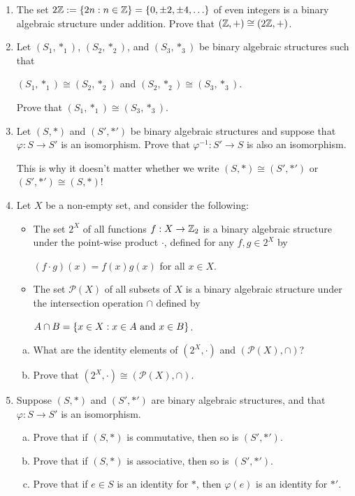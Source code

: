 \documentclass[11pt,fleqn,dvipsnames,usenames]{article}
\begin{document}
\begin{enumerate}[1.]
\item The set $2\mathbb{Z} := \left\{2n:n\in\mathbb{Z}\right\} = \left\{0, \pm 2, \pm 4,\ldots\right\}$ of even integers is a binary algebraic structure under addition.  Prove that $(\mathbb{Z},+)\cong (2\mathbb{Z},+)$.
%
\item Let $(S_{1},*_{1})$, $(S_{2}, *_{2})$, and $(S_{3}, *_{3})$ be binary algebraic structures such that
\begin{center}
$(S_{1},*_{1})\cong(S_{2},*_{2})$ and $(S_{2},*_{2})\cong(S_{3},*_{3})$.
\end{center}
Prove that $(S_{1},*_{1})\cong(S_{3},*_{3})$.
%
\item Let $(S,*)$ and $(S',*')$ be binary algebraic structures and suppose that $\varphi:S\to S'$ is an isomorphism.  Prove that $\varphi^{-1}:S'\to S$ is also an isomorphism.

\note This is why it doesn't matter whether we write $(S,*)\cong (S',*')$ or $(S',*')\cong (S,*)$!
%
\item Let $X$ be a non-empty set, and consider the following:
\begin{itemize}
\item The set $2^{X}$ of all functions $f:X\to\mathbb{Z}_{2}$ is a binary algebraic structure under the point-wise product $\cdot$, defined for any $f,g\in 2^{X}$ by
\begin{center}
$(f \cdot g)(x) = f(x)g(x)$ for all $x\in X$.
\end{center}
\item The set $\mathcal{P}(X)$ of all subsets of $X$ is a binary algebraic structure under the intersection operation $\cap$ defined by
\begin{center}
$A\cap B = \left\{x\in X:x\in A\text{ and }x\in B\right\}$.
\end{center}
\end{itemize}
\begin{enumerate}[(a)]
\item What are the identity elements of $(2^{X}, \cdot)$ and $(\mathcal{P}(X), \cap)$?
\item Prove that $(2^{X}, \cdot)\cong (\mathcal{P}(X), \cap)$.
\end{enumerate}
%
\item Suppose $(S,*)$ and $(S',*')$ are binary algebraic structures, and that $\varphi:S\to S'$ is an isomorphism.
\begin{enumerate}[(a)]
\item Prove that if $(S,*)$ is commutative, then so is $(S',*')$.
\item Prove that if $(S,*)$ is associative, then so is $(S',*')$.
\item Prove that if $e\in S$ is an identity for $*$, then $\varphi(e)$ is an identity for $*'$.
\end{enumerate}
\end{enumerate}
\vsp
\end{document}
